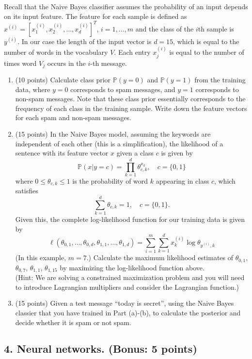 \documentclass[twoside,10pt]{article}
\begin{document}
Recall that the Naive Bayes classifier assumes the probability of an input depends on its input feature. The feature for each sample is defined as
$x^{(i)} = [x_1^{(i)}, x_2^{(i)}, \ldots, x_d^{(i)}]^T$, $i = 1, \ldots, m$ and the class of the $i$th sample is $y^{(i)}$. In our case the length of the input vector is $d = 15$, which is equal to the number of words in the vocabulary $V$. Each entry $x_j^{(i)}$ is equal to the number of times word $V_j$ occurs in the $i$-th message. 

\begin{enumerate}
\item (10 points) Calculate class prior $\mathbb P(y = 0)$ and $\mathbb P(y = 1)$ from the training data, where $y = 0$ corresponds to spam messages, and $y = 1$ corresponds to non-spam messages. Note that these class prior essentially corresponds to the frequency of each class in the training sample. Write down the feature vectors for each spam and non-spam messages.
\item (15 points) In the Naive Bayes model, assuming the keywords are independent of each other (this is a simplification), the likelihood of a sentence with its feature vector $x$ given a class $c$ is given by 
\[
\mathbb P (x|y = c) = \prod_{k=1}^d \theta_{c, k}^{x_k}, \quad c = \{0, 1\}
\]
where $0 \leq \theta_{c,k} \leq 1$ is the probability of word $k$ appearing in class $c$, which satisfies 
\[\sum_{k=1}^d \theta_{c,k} = 1, \quad c = \{0, 1\}.\] Given this, the complete log-likelihood function for our training data is given by
\[
\ell(\theta_{0,1}, \ldots, \theta_{0, d}, \theta_{1,1}, \ldots, \theta_{1, d}) = 
\sum_{i=1}^m \sum_{k=1}^d x_k^{(i)} \log \theta_{y^{(i)}, k}
\]
(In this example, $m = 7$.)
 Calculate the maximum likelihood estimates of $\theta_{0,1}$, $\theta_{0,7}$, $\theta_{1,1}$, $\theta_{1,15}$ by maximizing the log-likelihood function above.\\
 (Hint: We are solving a constrained maximization problem and you will need to introduce Lagrangian multipliers and consider the Lagrangian function.)
\item (15 points) Given a test message ``\textsf{today is secret}'', using the Naive Bayes classier that you have trained in Part (a)-(b), to calculate the posterior and decide whether it is spam or not spam.

\end{enumerate}



\subsection*{\bf 4. Neural networks. (Bonus: 5 points)}
\end{document}
